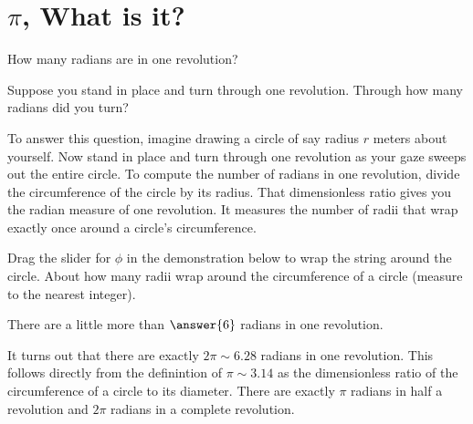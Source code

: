 \documentclass{ximera}
\begin{document}
\section{$\pi$, What is it?}
\begin{exploration}  \label{E33:Angles}
How many radians are in one revolution?


Suppose you stand in place and turn through one revolution. Through how many radians did you turn?

To answer this question, imagine drawing a circle of say radius $r$ meters about yourself. Now stand in place and turn through one revolution as your gaze sweeps out the entire circle. To compute the number of radians in one revolution, divide the circumference of the circle by its radius. That dimensionless ratio gives you the radian measure of one revolution. It measures the number of radii that wrap exactly once around a circle's circumference.


\begin{question}
Drag the slider for $\phi$ in the demonstration below to wrap the string around the circle. About how many radii wrap around the circumference of a circle (measure to the nearest integer). 

There are a little more than $\answer{6}$ radians in one revolution.

\end{question}

It turns out that there are exactly $2\pi \sim 6.28$ radians in one revolution. This follows directly from the definintion of $\pi \sim 3.14$ as the dimensionless ratio of the circumference of a circle to its diameter. There are exactly $\pi$ radians in half a revolution and $2\pi$ radians in a complete revolution.


 
\begin{onlineOnly}
    \begin{center}
\end{center}
\end{onlineOnly}
\end{exploration}
\end{document}
